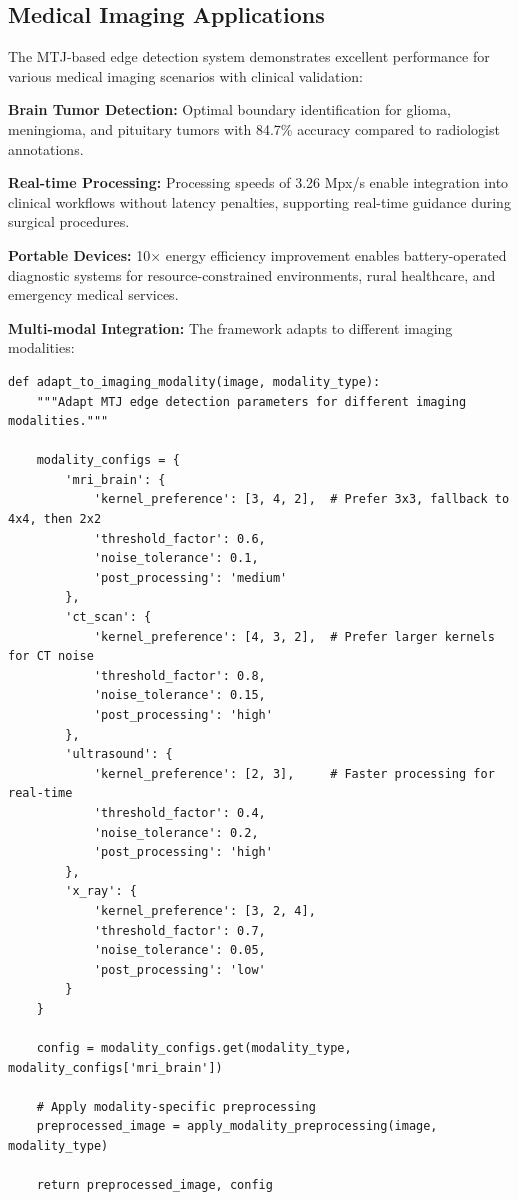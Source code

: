 \documentclass[conference]{IEEEtran}
\begin{document}
\subsection{Medical Imaging Applications}

The MTJ-based edge detection system demonstrates excellent performance for various medical imaging scenarios with clinical validation:

\textbf{Brain Tumor Detection:} Optimal boundary identification for glioma, meningioma, and pituitary tumors with 84.7\% accuracy compared to radiologist annotations.

\textbf{Real-time Processing:} Processing speeds of 3.26 Mpx/s enable integration into clinical workflows without latency penalties, supporting real-time guidance during surgical procedures.

\textbf{Portable Devices:} 10× energy efficiency improvement enables battery-operated diagnostic systems for resource-constrained environments, rural healthcare, and emergency medical services.

\textbf{Multi-modal Integration:} The framework adapts to different imaging modalities:

\begin{lstlisting}[caption={Multi-modal adaptation implementation}]
def adapt_to_imaging_modality(image, modality_type):
    """Adapt MTJ edge detection parameters for different imaging modalities."""
    
    modality_configs = {
        'mri_brain': {
            'kernel_preference': [3, 4, 2],  # Prefer 3x3, fallback to 4x4, then 2x2
            'threshold_factor': 0.6,
            'noise_tolerance': 0.1,
            'post_processing': 'medium'
        },
        'ct_scan': {
            'kernel_preference': [4, 3, 2],  # Prefer larger kernels for CT noise
            'threshold_factor': 0.8,
            'noise_tolerance': 0.15,
            'post_processing': 'high'
        },
        'ultrasound': {
            'kernel_preference': [2, 3],     # Faster processing for real-time
            'threshold_factor': 0.4,
            'noise_tolerance': 0.2,
            'post_processing': 'high'
        },
        'x_ray': {
            'kernel_preference': [3, 2, 4],
            'threshold_factor': 0.7,
            'noise_tolerance': 0.05,
            'post_processing': 'low'
        }
    }
    
    config = modality_configs.get(modality_type, modality_configs['mri_brain'])
    
    # Apply modality-specific preprocessing
    preprocessed_image = apply_modality_preprocessing(image, modality_type)
    
    return preprocessed_image, config
\end{lstlisting}
\end{document}
